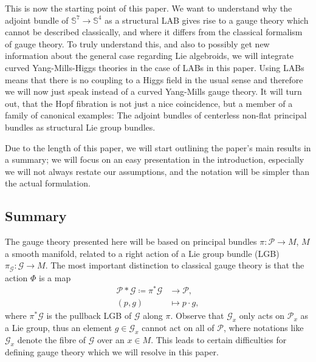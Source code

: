 \documentclass[reqno,a4paper,oneside]{amsart}
\theoremstyle{plain}
\theoremstyle{remark}
\theoremstyle{definition}
\begin{document}
This is now the starting point of this paper. We want to understand why the adjoint bundle of $\mathbb{S}^7 \to \mathbb{S}^4$ as a structural LAB gives rise to a gauge theory which cannot be described classically, and where it differs from the classical formalism of gauge theory. To truly understand this, and also to possibly get new information about the general case regarding Lie algebroids, we will integrate curved Yang-Mills-Higgs theories in the case of LABs in this paper. Using LABs means that there is no coupling to a Higgs field in the usual sense and therefore we will now just speak instead of a curved Yang-Mills gauge theory. It will turn out, that the Hopf fibration is not just a nice coincidence, but a member of a family of canonical examples: The adjoint bundles of centerless non-flat principal bundles as structural Lie group bundles.

Due to the length of this paper, we will start outlining the paper's main results in a summary; we will focus on an easy presentation in the introduction, especially we will not always restate our assumptions, and the notation will be simpler than the actual formulation.

\subsection{Summary}

The gauge theory presented here will be based on principal bundles $\pi\colon\mathcal{P} \to M$, $M$ a smooth manifold, related to a right action of a Lie group bundle (LGB) $\pi_{\mathcal{G}} \colon \mathcal{G} \to M$. The most important distinction to classical gauge theory is that the action $\Phi$ is a map
\begin{align*}
\mathcal{P} * \mathcal{G} \coloneqq \pi^*\mathcal{G} &\to \mathcal{P},\\
(p, g) &\mapsto p \cdot g,
\end{align*}
where $\pi^*\mathcal{G}$ is the pullback LGB of $\mathcal{G}$ along $\pi$. Observe that $\mathcal{G}_x$ only acts on $\mathcal{P}_x$ as a Lie group, thus an element $g \in \mathcal{G}_x$ cannot act on all of $\mathcal{P}$, where notations like $\mathcal{G}_x$ denote the fibre of $\mathcal{G}$ over an $x \in M$. This leads to certain difficulties for defining gauge theory which we will resolve in this paper.

\end{document}
